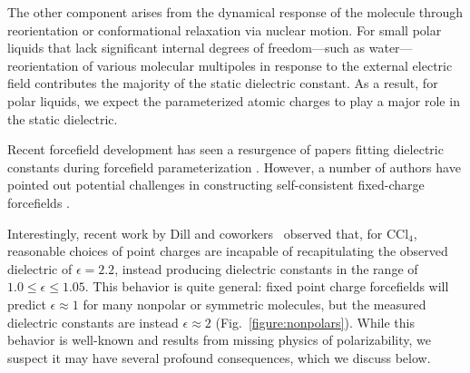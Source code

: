 \documentclass[journal=jacsat,manuscript=article]{achemso}
\begin{document}
The other component arises from the dynamical response of the molecule through reorientation or conformational relaxation via nuclear motion.
For small polar liquids that lack significant internal degrees of freedom---such as water---reorientation of various molecular multipoles in response to the external electric field contributes the majority of the static dielectric constant. 
As a result, for polar liquids, we expect the parameterized atomic charges to play a major role in the static dielectric.  

Recent forcefield development has seen a resurgence of papers fitting dielectric constants during forcefield parameterization \cite{wang2014building, fennell2014fixed}.  
However, a number of authors have pointed out potential challenges in constructing self-consistent fixed-charge forcefields \cite{fennell2012simple, leontyev2014polarizable}.  


Interestingly, recent work by Dill and coworkers~\cite{fennell2012simple} observed that, for $\mathrm{CCl_4}$, reasonable choices of point charges are incapable of recapitulating the observed dielectric of $\epsilon = 2.2$, instead producing dielectric constants in the range of $1.0 \le \epsilon \le 1.05$.  
This behavior is quite general: fixed point charge forcefields will predict $\epsilon \approx 1$ for many nonpolar or symmetric molecules, but the measured dielectric constants are instead $\epsilon \approx 2$ (Fig.~\ref{figure:nonpolars}).  
While this behavior is well-known and results from missing physics of polarizability, we suspect it may have several profound consequences, which we discuss below.


\end{document}
